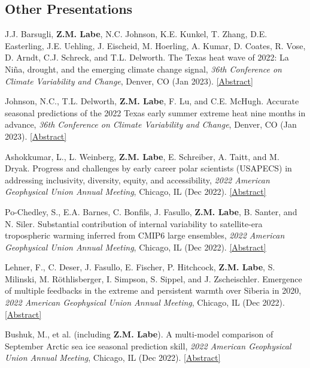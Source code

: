 \documentclass[margin,line,palatino,courier,10pt]{res}
\begin{document}
\begin{resume}
\section{\sc \textcolor{Cerulean}{\large{\textbf{Other Presentations}}}} 
\begin{etaremune}[leftmargin=0in,topsep=0in,parsep=0in]
\item J.J. Barsugli, \textbf{Z.M. Labe}, N.C. Johnson, K.E. Kunkel, T. Zhang, D.E. Easterling, J.E. Uehling, J. Eischeid, M. Hoerling, A. Kumar, D. Coates, R. Vose, D. Arndt, C.J. Schreck, and T.L. Delworth. The Texas heat wave of 2022: La Niña, drought, and the emerging climate change signal, \textit{36th Conference on Climate Variability and Change}, Denver, CO (Jan 2023). \href{https://ams.confex.com/ams/103ANNUAL/meetingapp.cgi/Paper/421815}{[Abstract]}
\item Johnson, N.C., T.L. Delworth, \textbf{Z.M. Labe}, F. Lu, and C.E. McHugh. Accurate seasonal predictions of the 2022 Texas early summer extreme heat nine months in advance, \textit{36th Conference on Climate Variability and Change}, Denver, CO (Jan 2023). \href{https://ams.confex.com/ams/103ANNUAL/meetingapp.cgi/Paper/418044}{[Abstract]}
\item Ashokkumar, L., L. Weinberg, \textbf{Z.M. Labe}, E. Schreiber, A. Taitt, and M. Dryak. Progress and challenges by early career polar scientists (USAPECS) in addressing inclusivity, diversity, equity, and accessibility, \textit{2022 American Geophysical Union Annual Meeting}, Chicago, IL (Dec 2022). \href{https://agu.confex.com/agu/fm22/meetingapp.cgi/Paper/1192493}{[Abstract]}
\item Po-Chedley, S., E.A. Barnes, C. Bonfils, J. Fasullo, \textbf{Z.M. Labe}, B. Santer, and N. Siler. Substantial contribution of internal variability to satellite-era tropospheric warming inferred from CMIP6 large ensembles, \textit{2022 American Geophysical Union Annual Meeting}, Chicago, IL (Dec 2022). \href{https://agu.confex.com/agu/fm22/meetingapp.cgi/Paper/1095614}{[Abstract]}
\item Lehner, F., C. Deser, J. Fasullo, E. Fischer, P. Hitchcock, \textbf{Z.M. Labe}, S. Milinski, M. Röthlisberger, I. Simpson, S. Sippel, and J. Zscheischler. Emergence of multiple feedbacks in the extreme and persistent warmth over Siberia in 2020, \textit{2022 American Geophysical Union Annual Meeting}, Chicago, IL (Dec 2022). \href{https://agu.confex.com/agu/fm22/meetingapp.cgi/Paper/1190729}{[Abstract]}
\item Bushuk, M., et al. (including \textbf{Z.M. Labe}). A multi-model comparison of September Arctic sea ice seasonal prediction skill, \textit{2022 American Geophysical Union Annual Meeting}, Chicago, IL (Dec 2022). \href{https://agu.confex.com/agu/fm22/meetingapp.cgi/Paper/1179488}{[Abstract]}

\end{etaremune}
\end{resume}
\end{document}
